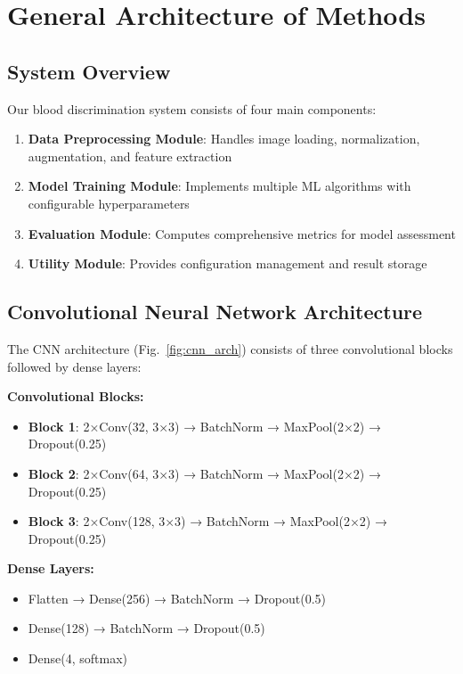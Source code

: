 \documentclass[runningheads]{llncs}
\begin{document}
\section{General Architecture of Methods}

\subsection{System Overview}

Our blood discrimination system consists of four main components:

\begin{enumerate}
    \item \textbf{Data Preprocessing Module}: Handles image loading, normalization, augmentation, and feature extraction
    \item \textbf{Model Training Module}: Implements multiple ML algorithms with configurable hyperparameters
    \item \textbf{Evaluation Module}: Computes comprehensive metrics for model assessment
    \item \textbf{Utility Module}: Provides configuration management and result storage
\end{enumerate}

\subsection{Convolutional Neural Network Architecture}

The CNN architecture (Fig.~\ref{fig:cnn_arch}) consists of three convolutional blocks followed by dense layers:

\textbf{Convolutional Blocks:}
\begin{itemize}
    \item \textbf{Block 1}: 2×Conv(32, 3×3) → BatchNorm → MaxPool(2×2) → Dropout(0.25)
    \item \textbf{Block 2}: 2×Conv(64, 3×3) → BatchNorm → MaxPool(2×2) → Dropout(0.25)
    \item \textbf{Block 3}: 2×Conv(128, 3×3) → BatchNorm → MaxPool(2×2) → Dropout(0.25)
\end{itemize}

\textbf{Dense Layers:}
\begin{itemize}
    \item Flatten → Dense(256) → BatchNorm → Dropout(0.5)
    \item Dense(128) → BatchNorm → Dropout(0.5)
    \item Dense(4, softmax)
\end{itemize}
\end{document}
